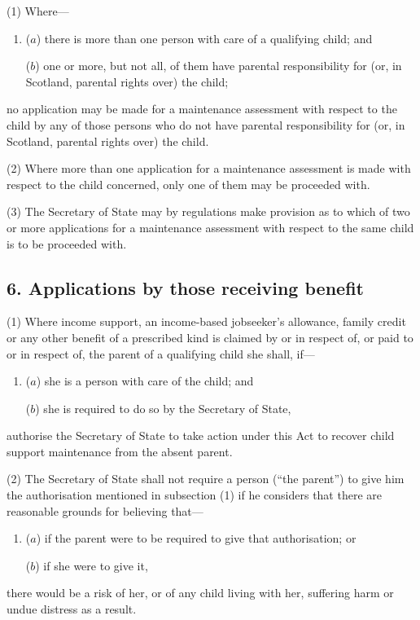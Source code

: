 \documentclass[12pt,a4paper]{article}
\begin{document}
(1) Where—
\begin{enumerate}\item[]
($a$) there is more than one person with care of a qualifying child; and

($b$) one or more, but not all, of them have parental responsibility for (or, in Scotland, parental rights over) the child;
\end{enumerate}
no application may be made for a maintenance assessment with respect to the child by any of those persons who do not have parental responsibility for (or, in Scotland, parental rights over) the child.

(2) Where more than one application for a maintenance assessment is made with respect to the child concerned, only one of them may be proceeded with.

(3) The Secretary of State may by regulations make provision as to which of two or more applications for a maintenance assessment with respect to the same child is to be proceeded with.


\subsection{6. Applications by those receiving benefit}

(1) Where income support, 
an income-based jobseeker’s allowance,  %
family credit or any other benefit of a prescribed kind is claimed by or in respect of, or paid to or in respect of, the parent of a qualifying child she shall, if—
\begin{enumerate}\item[]
($a$) she is a person with care of the child; and

($b$) she is required to do so by the Secretary of State,
\end{enumerate}
authorise the Secretary of State to take action under this Act to recover child support maintenance from the absent parent.

(2) The Secretary of State shall not require a person (“the parent”) to give him the authorisation mentioned in subsection (1)  if he considers that there are reasonable grounds for believing that—
\begin{enumerate}\item[]
($a$) if the parent were to be required to give that authorisation; or

($b$) if she were to give it,
\end{enumerate}
there would be a risk of her, or of any child living with her, suffering harm or undue distress as a result.
\end{document}
